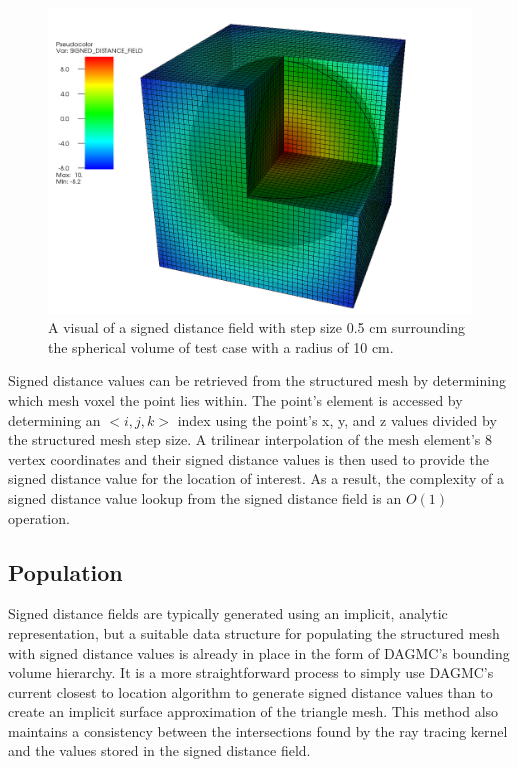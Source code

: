 \begin{figure}
  \centering
  \includegraphics[scale=0.3]{../images/sdf_sphere.png}
  \caption{A visual of a signed distance field with step size 0.5 cm surrounding
    the spherical volume of test case with a radius of 10 cm.}
  \label{fig:sdf_sphere}
\end{figure}

Signed distance values can be retrieved from the structured mesh by determining
which mesh voxel the point lies within. The point's element is accessed by
determining an $<i,j,k>$ index using the point's x, y, and z values divided by
the structured mesh step size. A trilinear interpolation of the mesh element's 8
vertex coordinates and their signed distance values is then used to provide the
signed distance value for the location of interest. As a result, the complexity
of a signed distance value lookup from the signed distance field is an
$O(1)$ operation.

\subsection{Population}

Signed distance fields are typically generated using an implicit, analytic
representation, but a suitable data structure for populating the structured mesh
with signed distance values is already in place in the form of DAGMC's bounding
volume hierarchy. It is a more straightforward process to simply use DAGMC's
current closest to location algorithm to generate signed distance values than to
create an implicit surface approximation of the triangle mesh. This method also
maintains a consistency between the intersections found by the ray tracing
kernel and the values stored in the signed distance field.


